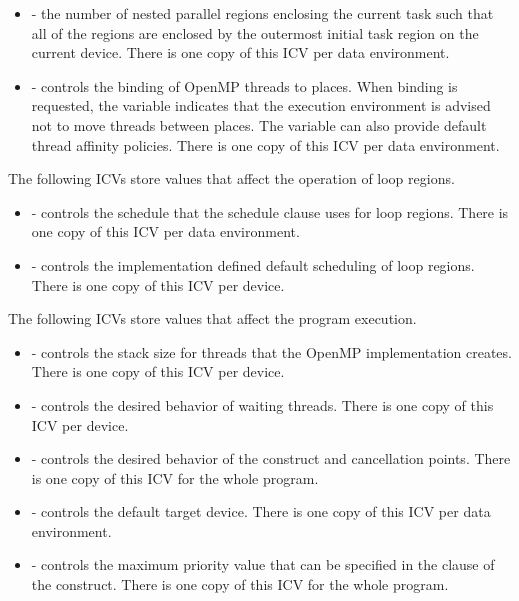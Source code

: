 \begin{itemize}
\item {} - the number of nested parallel regions enclosing the current task such that 
all of the  regions are enclosed by the outermost initial task region on the 
current device. There is one copy of this ICV per data environment. 

\item {} - controls the binding of OpenMP threads to places. When binding is 
requested, the variable indicates that the execution environment is advised not to 
move threads between places. The variable can also provide default thread affinity 
policies. There is one copy of this ICV per data environment. 
\end{itemize}

The following ICVs store values that affect the operation of loop regions.

\begin{itemize}
\item {} - controls the schedule that the  schedule clause uses for 
loop regions. There is one copy of this ICV per data environment.

\item {} - controls the implementation defined default scheduling of loop 
regions. There is one copy of this ICV per device. 
\end{itemize}

The following ICVs store values that affect the program execution.

\begin{itemize}
\item {} - controls the stack size for threads that the OpenMP implementation 
creates. There is one copy of this ICV per device. 

\item {} - controls the desired behavior of waiting threads. There is one copy 
of this ICV per device. 

\item {} - controls the desired behavior of the  construct and cancellation 
points. There is one copy of this ICV for the whole program.

\item {} - controls the default target device. There is one copy of this ICV 
per data environment.

\item {} - controls the maximum priority value that can be specified in the
 clause of the  construct. There is one copy of this ICV for the whole program.

\end{itemize}






